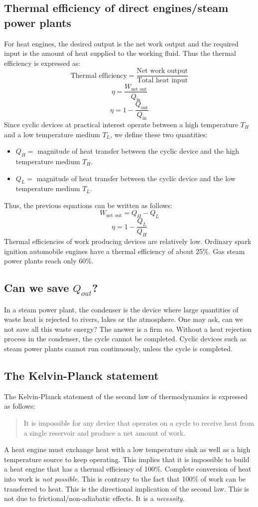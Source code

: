 \documentclass[class=report, crop=false, 12pt,a4paper]{standalone}
\begin{document}
\subsection{Thermal efficiency of direct engines/steam power plants}
For heat engines, the desired output is the net work output and the required input is the amount of heat supplied to the working fluid. Thus the thermal efficiency is expressed as:
\[ \textrm{Thermal efficiency} = \frac{\textrm{Net work output}}{\textrm{Total heat input}} \]
\[ \eta = \frac{W_{\textrm{net out}}}{Q_{\textrm{in}}} \]
\[ \eta = 1 - \frac{Q_{\textrm{out}}}{Q_{\textrm{in}}} \]
Since cyclic devices at practical interest operate between a high temperature \(T_H\) and a low temperature medium \(T_L\), we define these two quantities:
\begin{itemize}
  \item {\(Q_H =\)} magnitude of heat transfer between the cyclic device and the high temperature medium \(T_H\).
  \item {\(Q_L =\)} magnitude of heat transfer between the cyclic device and the low temperature medium \(T_L\).
\end{itemize}
Thus, the previous equations can be written as follows:
\[ W_{\textrm{net out}} = Q_H - Q_L \]
\[ \eta = 1 - \frac{Q_L}{Q_H} \]
Thermal efficiencies of work producing devices are relatively low. Ordinary spark ignition automobile engines have a thermal efficiency of about 25\%. Gas steam power plants reach only 60\%.
\subsection{Can we save \(Q_{out}\)?}
In a steam power plant, the condenser is the device where large quantities of waste heat is rejected to rivers, lakes or the atmosphere. One may ask, can we not save all this waste energy? The answer is a firm \emph{no}. Without a heat rejection process in the condenser, the cycle cannot be completed. Cyclic devices such as steam power plants cannot run continuously, unless the cycle is completed.
\subsection{The Kelvin-Planck statement}
The Kelvin-Planck statement of the second law of thermodynamics is expressed as follows:
\begin{quote}
  \begin{center}
    It is impossible for any device that operates on a cycle to receive heat from a single reservoir and produce a net amount of work.
  \end{center}
\end{quote}
A heat engine must exchange heat with a low temperature sink as well as a high temperature source to keep operating. This implies that it is impossible to build a heat engine that has a thermal efficiency of 100\%. Complete conversion of heat into work is \emph{not possible.} This is contrary to the fact that 100\% of work can be transferred to heat. This is the directional implication of the second law. This is not due to frictional/non-adiabatic effects. It is a \emph{necessity.}
\end{document}

